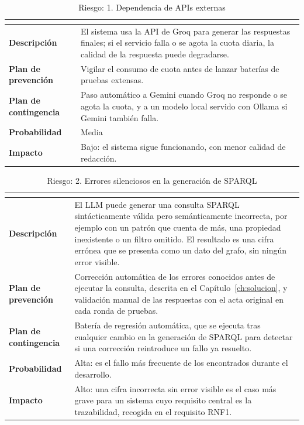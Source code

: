 \documentclass[11pt, a4paper]{report}
\begin{document}
	\begin{table}[H]
		\centering
		\begin{tabularx}{\linewidth}{|>{\bfseries}l|X|}
			\hline
			\rowcolor{riesgo-header}
			\multicolumn{2}{|c|}{\textcolor{white}{\textbf{1. Dependencia de APIs externas (Groq)}}} \\
			\hline
			Descripción & El sistema usa la API de Groq para generar las respuestas
			finales; si el servicio falla o se agota la cuota diaria, la calidad de
			la respuesta puede degradarse. \\
			\hline
			\rowcolor{fila-alterna}
			Plan de prevención & Vigilar el consumo de cuota antes de lanzar
			baterías de pruebas extensas. \\
			\hline
			Plan de contingencia & Paso automático a Gemini cuando Groq no responde o se agota la cuota, y a un modelo local servido con Ollama si Gemini también falla. \\
			\hline
			\rowcolor{fila-alterna}
			Probabilidad & Media \\
			\hline
			Impacto & Bajo: el sistema sigue funcionando, con menor calidad de redacción. \\
			\hline
		\end{tabularx}
		\caption{Riesgo: 1. Dependencia de APIs externas}
		\label{tab:riesgo-groq}
	\end{table}

	\begin{table}[H]
		\centering
		\begin{tabularx}{\linewidth}{|>{\bfseries}l|X|}
			\hline
			\rowcolor{riesgo-header}
			\multicolumn{2}{|c|}{\textcolor{white}{\textbf{2. Errores silenciosos en la generación de SPARQL}}} \\
			\hline
			Descripción & El LLM puede generar una consulta SPARQL sintácticamente válida pero semánticamente incorrecta, por ejemplo con un patrón que cuenta de más, una propiedad inexistente o un filtro omitido. El resultado es una cifra errónea que se presenta como un dato del grafo, sin ningún error visible. \\
			\hline
			\rowcolor{fila-alterna}
			Plan de prevención & Corrección automática de los errores conocidos antes de ejecutar la consulta, descrita en el Capítulo~\ref{ch:solucion}, y validación manual de las respuestas con el acta original en cada ronda de pruebas. \\
			\hline
			Plan de contingencia & Batería de regresión automática, que se ejecuta tras cualquier cambio en la generación de SPARQL para detectar si una corrección reintroduce un fallo ya resuelto. \\
			\hline
			\rowcolor{fila-alterna}
			Probabilidad & Alta: es el fallo más frecuente de los encontrados durante el desarrollo. \\
			\hline
			Impacto & Alto: una cifra incorrecta sin error visible es el caso más grave para un sistema cuyo requisito central es la trazabilidad, recogida en el requisito RNF1. \\
			\hline
		\end{tabularx}
		\caption{Riesgo: 2. Errores silenciosos en la generación de SPARQL}
		\label{tab:riesgo-sparql}
	\end{table}
\end{document}
